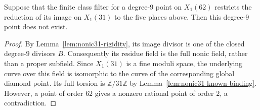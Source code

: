 \begin{corollary}\label{cor:nonic62-positive-rigidity}
Suppose that the finite class filter for a degree-$9$ point on $X_1(62)$
restricts the reduction of its image on $X_1(31)$ to the five places above.
Then this degree-$9$ point does not exist.
\end{corollary}
\begin{proof}
By Lemma~\ref{lem:nonic31-rigidity}, its image divisor is one of the
closed degree-$9$ divisors $B$. Consequently its residue field is the
full nonic field, rather than a proper subfield. Since $X_1(31)$ is a
fine moduli space, the underlying curve over this field is isomorphic
to the curve of the corresponding global diamond point. Its full torsion
is $\mathbb Z/31\mathbb Z$ by
Lemma~\ref{lem:nonic31-known-binding}. However, a point of order $62$
gives a nonzero rational point of order $2$, a contradiction.
\end{proof}
